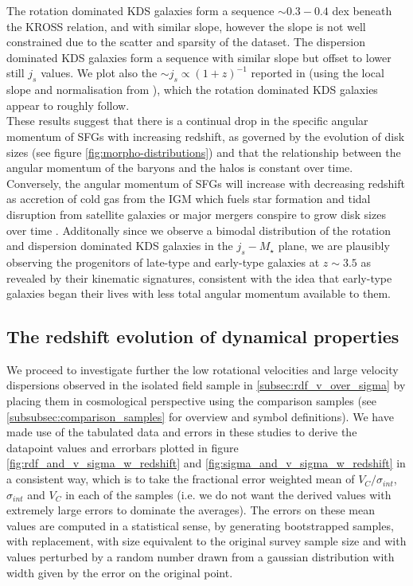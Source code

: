 \documentclass[fleqn,usenatbib]{mn2e}
\begin{document}
The rotation dominated KDS galaxies form a sequence $\sim 0.3-0.4$ dex beneath the KROSS relation, and with similar slope, however the slope is not well constrained due to the scatter and sparsity of the dataset.
The dispersion dominated KDS galaxies form a sequence with similar slope but offset to lower still $j_{s}$ values.
We plot also the $\sim j_{s} \propto (1+z)^{-1}$ reported in \cite{Swinbank2017} (using the local slope and normalisation from \cite{Romanowsky2012}), which the rotation dominated KDS galaxies appear to roughly follow. \\

These results suggest that there is a continual drop in the specific angular momentum of SFGs with increasing redshift, as governed by the evolution of disk sizes \citep[e.g.][]{Trujillo2007} (see figure \ref{fig:morpho-distributions}) and that the relationship between the angular momentum of the baryons and the halos is constant over time.
Conversely, the angular momentum of SFGs will increase with decreasing redshift as accretion of cold gas from the IGM which fuels star formation and tidal disruption from satellite galaxies or major mergers conspire to grow disk sizes over time \citep{Trujillo2007,Buitrago2008,VanderWel2014a}.
Additonally since we observe a bimodal distribution of the rotation and dispersion dominated KDS galaxies in the $j_{s}-M_{\star}$ plane, we are plausibly observing the progenitors of late-type and early-type galaxies at $z\sim3.5$ as revealed by their kinematic signatures, consistent with the idea that early-type galaxies began their lives with less total angular momentum available to them.


\subsection{The redshift evolution of dynamical properties}\label{subsec:redshift_evolution}
We proceed to investigate further the low rotational velocities and large velocity dispersions observed in the isolated field sample in \cref{subsec:rdf_v_over_sigma} by placing them in cosmological perspective using the comparison samples (see \cref{subsubsec:comparison_samples} for overview and symbol definitions).
We have made use of the tabulated data and errors in these studies to derive the datapoint values and errorbars plotted in figure \ref{fig:rdf_and_v_sigma_w_redshift} and \ref{fig:sigma_and_v_sigma_w_redshift} in a consistent way, which is to take the fractional error weighted mean of $V_{C}/\sigma_{int}$, $\sigma_{int}$ and $V_{C}$ in each of the samples (i.e. we do not want the derived values with extremely large errors to dominate the averages).
The errors on these mean values are computed in a statistical sense, by generating bootstrapped samples, with replacement, with size equivalent to the original survey sample size and with values perturbed by a random number drawn from a gaussian distribution with width given by the error on the original point. \\
\end{document}
